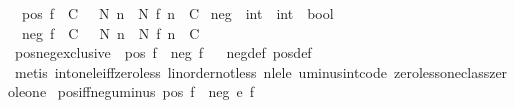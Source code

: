 \begin{isabellebody}
\ \ {\isachardoublequoteopen}pos\ f\ {\isacharequal}{\kern0pt}\ {\isacharparenleft}{\kern0pt}{\isasymforall}C\ {\isasymge}\ {}{\isachardot}{\kern0pt}\ {\isasymexists}N{\isachardot}{\kern0pt}\ {\isasymforall}n\ {\isasymge}\ N{\isachardot}{\kern0pt}\ f\ n\ {\isasymge}\ C{\isacharparenright}{\kern0pt}{\isachardoublequoteclose}\isanewline
\isanewline
{}\isamarkupfalse%
\ neg\ {\isacharcolon}{\kern0pt}{\isacharcolon}{\kern0pt}\ {\isachardoublequoteopen}{\isacharparenleft}{\kern0pt}int\ {\isasymRightarrow}\ int{\isacharparenright}{\kern0pt}\ {\isasymRightarrow}\ bool{\isachardoublequoteclose}\ \isanewline
\ \ {\isachardoublequoteopen}neg\ f\ {\isacharequal}{\kern0pt}\ {\isacharparenleft}{\kern0pt}{\isasymforall}C\ {\isasymge}\ {}{\isachardot}{\kern0pt}\ {\isasymexists}N{\isachardot}{\kern0pt}\ {\isasymforall}n\ {\isasymge}\ N{\isachardot}{\kern0pt}\ f\ n\ {\isasymle}\ {\isacharminus}{\kern0pt}C{\isacharparenright}{\kern0pt}{\isachardoublequoteclose}\isanewline
\ \ \ \ \ \ \ \ \ \ \ \ \ \ \ \ \ \ \ \ \ \ \ \ \ \ \ \ \ \ \ \ \ \ \isanewline
{}\isamarkupfalse%
\ pos{\isacharunderscore}{\kern0pt}neg{\isacharunderscore}{\kern0pt}exclusive{\isacharcolon}{\kern0pt}\ {\isachardoublequoteopen}{\isasymnot}\ {\isacharparenleft}{\kern0pt}pos\ f\ {\isasymand}\ neg\ f{\isacharparenright}{\kern0pt}{\isachardoublequoteclose}%
\isadelimproof
\ %
\endisadelimproof
%
\isatagproof
{}\isamarkupfalse%
\ neg{\isacharunderscore}{\kern0pt}def\ pos{\isacharunderscore}{\kern0pt}def\ \isamarkupfalse%
\ {\isacharparenleft}{\kern0pt}metis\ int{\isacharunderscore}{\kern0pt}one{\isacharunderscore}{\kern0pt}le{\isacharunderscore}{\kern0pt}iff{\isacharunderscore}{\kern0pt}zero{\isacharunderscore}{\kern0pt}less\ linorder{\isacharunderscore}{\kern0pt}not{\isacharunderscore}{\kern0pt}less\ nle{\isacharunderscore}{\kern0pt}le\ uminus{\isacharunderscore}{\kern0pt}int{\isacharunderscore}{\kern0pt}code{\isacharparenleft}{\kern0pt}{}{\isacharparenright}{\kern0pt}\ zero{\isacharunderscore}{\kern0pt}less{\isacharunderscore}{\kern0pt}one{\isacharunderscore}{\kern0pt}class{\isachardot}{\kern0pt}zero{\isacharunderscore}{\kern0pt}le{\isacharunderscore}{\kern0pt}one{\isacharparenright}{\kern0pt}%
\endisatagproof
{\isafoldproof}%
%
\isadelimproof
%
\endisadelimproof
\isanewline
\isanewline
{}\isamarkupfalse%
\ pos{\isacharunderscore}{\kern0pt}iff{\isacharunderscore}{\kern0pt}neg{\isacharunderscore}{\kern0pt}uminus{\isacharcolon}{\kern0pt}\ {\isachardoublequoteopen}pos\ f\ {\isacharequal}{\kern0pt}\ neg\ {\isacharparenleft}{\kern0pt}{\isacharminus}{\kern0pt}\isactrlsub e\ f{\isacharparenright}{\kern0pt}{\isachardoublequoteclose}%

\end{isabellebody}
